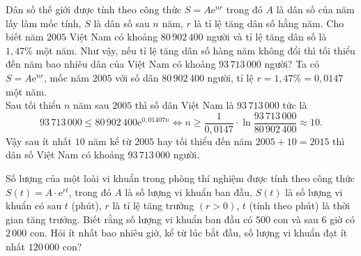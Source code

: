\begin{ex}%
Dân số thế giới được tính theo công thức $S=A\mathrm{e}^{nr}$ trong đó $A$ là dân số của năm lấy làm mốc tính, $S$ là dân số sau $n$ năm, $r$ là tỉ lệ tăng dân số hằng năm. Cho biết năm $2005$ Việt Nam có khoảng $80\,902\,400$ người và tỉ lệ tăng dân số là $1{,}47\%$ một năm. Như vậy, nếu tỉ lệ tăng dân số hàng năm không đổi thì tối thiểu đến năm bao nhiêu dân của Việt Nam có khoảng $93\,713\,000$ người?
\loigiai
{
Ta có $S=A\mathrm{e}^{nr}$, mốc năm $2005$ với số dân $80\,902\,400$ người, tỉ lệ $r=1{,}47\%=0{,}0147$ một năm.\\
Sau tối thiểu $n$ năm sau $2005$ thì số dân Việt Nam là $93\,713\,000$ tức là
$$93\,713\,000\leqslant 80\,902\,400\mathrm{e}^{0{,}01407n} \Leftrightarrow n\geqslant \dfrac{1}{0{,}0147}\cdot\ln \dfrac{93\,713\,000}{80\,902\,400}\approx 10.$$
Vậy sau ít nhất $10$ năm kể từ $2005$ hay tối thiểu đến năm $2005+10=2015$ thì dân số Việt Nam có khoảng $93\,713\,000$ người.
}
\end{ex}

\begin{ex}%
	Số lượng của một loài vi khuẩn trong phòng thí nghiệm được tính theo công thức $S(t)=A \cdot \mathrm{e}^{rt}$, trong đó $A$ là số lượng vi khuẩn ban đầu, $S(t)$ là số lượng vi khuẩn có sau $t$ (phút), $r$ là tỉ lệ tăng trưởng $(r>0)$, $t$ (tính theo phút) là thời gian tăng trưởng. Biết rằng số lượng vi khuẩn ban đầu có $500$ con và sau $6$ giờ có $2\,000$ con. Hỏi ít nhất bao nhiêu giờ, kể từ lúc bắt đầu, số lượng vi khuẩn đạt ít nhất $120 \, 000$ con?
\end{ex}

